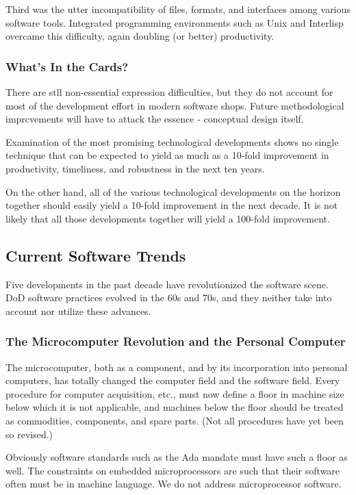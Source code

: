 \documentclass[11pt,final]{article}
\begin{document}
Third was the utter incompatibility of files, formats, and interfaces among
various software tools. Integrated programming environments such as Unix and
Interlisp overcame this difficulty, again doubling (or better) productivity.

\subsubsection*{What’s In the Cards?}

There are stll non-essential expression difficulties, but they do not account
for most of the development effort in modern software shops. Future
methodological imprcvements will have to attack the essence - conceptual design
itself.

Examination of the most promising technological developments shows no single
technique that can be expected to yield as much as a 10-fold improvement in
productivity, timeliness, and robustness in the next ten years.

On the other hand, all of the various technological developments on the horizon
together should easily yield a 10-fold improvement in the next decade. It is
not likely that all those developments together will yield a 100-fold
improvement.

\subsection{Current Software Trends}

Five developments in the past decade have revolutionized the software scene.
DoD software practices evolved in the 60s and 70s, and they neither take
into account nor utilize these advances.

\subsubsection*{The Microcomputer Revolution and the Personal Computer}

The microcomputer, both as a component, and by its incorporation into personal
computers, has totally changed the computer field and the software field. Every
procedure for computer acquisition, etc., must now define a floor in machine
size below which it is not applicable, and machines below the floor should be
treated as commodities, components, and spare parts. (Not all procedures have
yet been so revised.)

Obviously software standards such as the Ada mandate must have such a floor as
well. The constraints on embedded microprocessors are such that their
software often must be in machine language. We do not address microprocessor
software.
\end{document}
